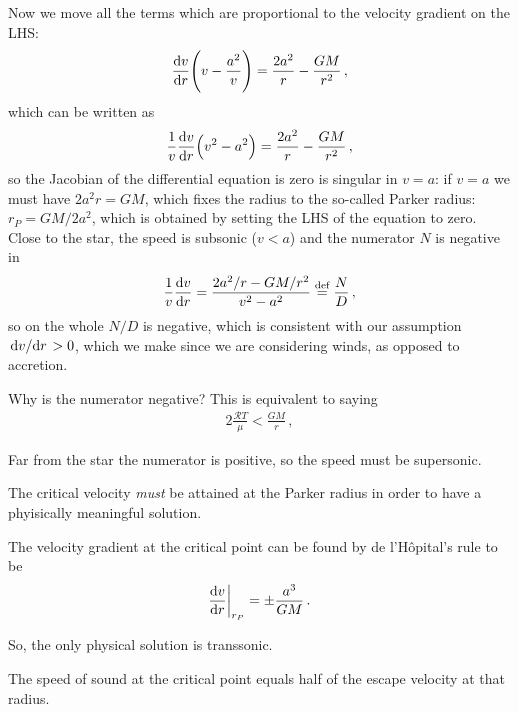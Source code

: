 \documentclass[main.tex]{subfiles}
\begin{document}
Now we move all the terms which are proportional to the velocity gradient on the LHS: 
%
\begin{equation}
  \dv{v}{r} \qty(v - \frac{a^2}{v}) = \frac{2a^2 }{r }-\frac{GM}{r^2}
\,,
\end{equation}
%
which can be written as
%
\begin{equation}
    \frac{1}{v}\dv{v}{r} \qty(v^2 - a^2) = \frac{2a^2 }{r }-\frac{GM}{r^2}
  \,,
\end{equation}
%
so the Jacobian of the differential equation is zero is singular in \(v=a\): if \(v=a\) we must have \(2a^2r = GM\), which fixes the radius to the so-called Parker radius: \(r_P = GM / 2 a^2\), which is obtained by setting the LHS of the equation to zero.
Close to the star, the speed is subsonic (\(v < a\)) and the numerator \(N\) is negative in 
%
\begin{equation}
  \frac{1}{v} \dv{v}{r} 
  = \frac{2 a^2 / r - GM/ r^2}{v^2- a^2}
  \overset{\text{def}}{=} \frac{N}{D}
\,,
\end{equation}
%
so on the whole \(N/D\) is negative,
which is consistent with our assumption \(\dv*{v}{r} > 0 \), which we make since we are considering winds, as opposed to accretion. 

\begin{bluebox}
Why is the numerator negative? This is equivalent to saying 
%
\begin{align}
2 \frac{\mathcal{R} T}{\mu } < \frac{GM}{r}
\,,
\end{align}
%

\end{bluebox}

Far from the star the numerator is positive, so the speed must be supersonic.

The critical velocity \emph{must} be attained at the Parker radius in order to have a phyisically meaningful solution.

The velocity gradient at the critical point can be found by de l'Hôpital's rule to be 
%
\begin{equation}
  \dv{v}{r} \bigg|_{r_P} = \pm \frac{a^3}{GM}
\,.
\end{equation}

So, the only physical solution is transsonic.

\begin{claim}[Exercise]
The speed of sound at the critical point equals half of the escape velocity at that radius.
\end{claim}
\end{document}
